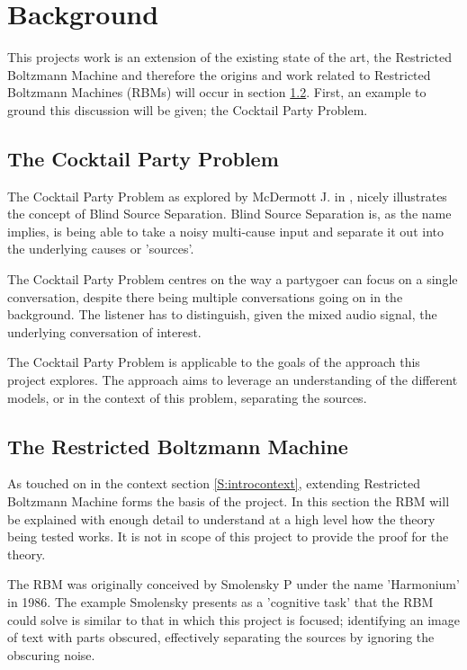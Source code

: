 
\chapter{Background}\label{C:background}

This projects work is an extension of the existing state of the art, the Restricted Boltzmann Machine and therefore the origins and work related to Restricted Boltzmann Machines (RBMs) will occur in section \ref{S:RBM}. First, an example to ground this discussion will be given; the Cocktail Party Problem.

\section{The Cocktail Party Problem}\label{SS:CPP}

The Cocktail Party Problem as explored by McDermott J. in \cite{McDermott:2009cs}, nicely illustrates the concept of Blind Source Separation. Blind Source Separation is, as the name implies, is being able to take a noisy multi-cause input and separate it out into the underlying causes or 'sources'.

The Cocktail Party Problem centres on the way a partygoer can focus on a single conversation, despite there being multiple conversations going on in the background. The listener has to distinguish, given the mixed audio signal, the underlying conversation of interest.

The Cocktail Party Problem is applicable to the goals of the approach this project explores. The approach aims to leverage an understanding of the different models, or in the context of this problem, separating the sources.

\section{The Restricted Boltzmann Machine}\label{S:RBM}

As touched on in the context section \ref{S:introcontext}, extending Restricted Boltzmann Machine forms the basis of the project. In this section the RBM will be explained with enough detail to understand at a high level how the theory being tested works. It is not in scope of this project to provide the proof for the theory.

The RBM  was originally  conceived by Smolensky P under the name 'Harmonium' \cite{Smolensky:1986vy}  in 1986. The example Smolensky presents as a 'cognitive task' that the RBM could solve is similar to that in which this project is focused; identifying an image of text with parts obscured, effectively separating the sources by ignoring the obscuring noise.

